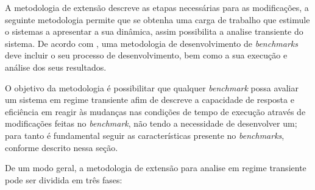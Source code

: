 A metodologia de extensão descreve as etapas necessárias para as modificações, a seguinte metodologia permite que se obtenha uma carga de trabalho que estimule o sistemas a apresentar a sua dinâmica, assim possibilita a analise transiente do sistema. De acordo com \cite{KaiSachs2010}, uma metodologia de desenvolvimento de \textit{benchmarks} deve incluir o seu processo de desenvolvimento, bem como a sua execução e análise dos seus resultados. 

O objetivo da metodologia é possibilitar que qualquer \textit{benchmark} possa avaliar um sistema em regime transiente afim de descreve a capacidade de resposta e eficiência em reagir às mudanças nas condições de tempo de execução através de modificações feitas no \textit{benchmark}, não tendo a necessidade de desenvolver um; para tanto é fundamental seguir as características presente no \textit{benchmarks}, conforme descrito nessa seção.

De um modo geral, a metodologia de extensão para analise em regime transiente pode ser dividida em três fases:

